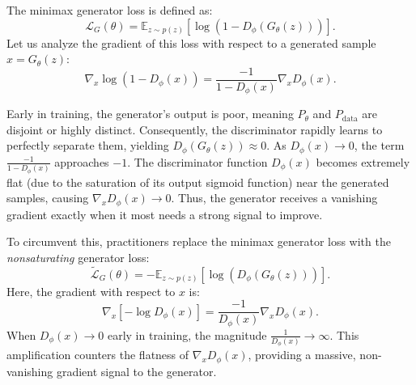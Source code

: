 The minimax generator loss is defined as:
\begin{equation}
    \mathcal{L}_G(\theta) = \mathbb{E}_{z \sim p(z)} [\log(1 - D_\phi(G_\theta(z)))].
\end{equation}
Let us analyze the gradient of this loss with respect to a generated sample $x = G_\theta(z)$:
\begin{equation}
    \nabla_x \log(1 - D_\phi(x)) = \frac{-1}{1 - D_\phi(x)} \nabla_x D_\phi(x).
\end{equation}

Early in training, the generator's output is poor, meaning $P_\theta$ and $P_{\text{data}}$ are disjoint or highly distinct. Consequently, the discriminator rapidly learns to perfectly separate them, yielding $D_\phi(G_\theta(z)) \approx 0$. As $D_\phi(x) \to 0$, the term $\frac{-1}{1 - D_\phi(x)}$ approaches $-1$. The discriminator function $D_\phi(x)$ becomes extremely flat (due to the saturation of its output sigmoid function) near the generated samples, causing $\nabla_x D_\phi(x) \to 0$. Thus, the generator receives a vanishing gradient exactly when it most needs a strong signal to improve.

To circumvent this, practitioners replace the minimax generator loss with the \textit{nonsaturating} generator loss:
\begin{equation}
    \mathcal{\tilde{L}}_G(\theta) = -\mathbb{E}_{z \sim p(z)} [\log(D_\phi(G_\theta(z)))].
\end{equation}
Here, the gradient with respect to $x$ is:
\begin{equation}
    \nabla_x [-\log D_\phi(x)] = \frac{-1}{D_\phi(x)} \nabla_x D_\phi(x).
\end{equation}
When $D_\phi(x) \to 0$ early in training, the magnitude $\frac{1}{D_\phi(x)} \to \infty$. This amplification counters the flatness of $\nabla_x D_\phi(x)$, providing a massive, non-vanishing gradient signal to the generator.


